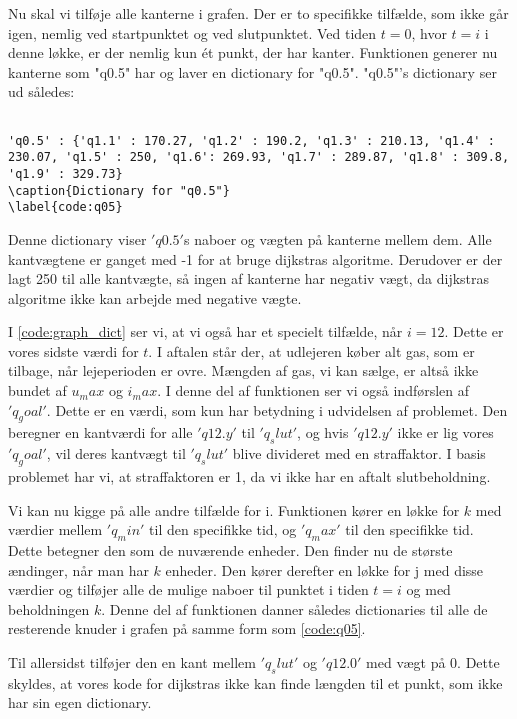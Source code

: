 Nu skal vi tilføje alle kanterne i grafen. Der er to specifikke tilfælde, som ikke går igen, nemlig ved startpunktet og ved slutpunktet. Ved tiden $t=0$, hvor $t=i$ i denne løkke, er der nemlig kun ét punkt, der har kanter. Funktionen generer nu kanterne som "q0.5" har og laver en dictionary for "q0.5". 
"q0.5"'s dictionary ser ud således:

\begin{lstlisting}

'q0.5' : {'q1.1' : 170.27, 'q1.2' : 190.2, 'q1.3' : 210.13, 'q1.4' : 230.07, 'q1.5' : 250, 'q1.6': 269.93, 'q1.7' : 289.87, 'q1.8' : 309.8, 'q1.9' : 329.73}
\caption{Dictionary for "q0.5"}
\label{code:q05}
\end{lstlisting}
Denne dictionary viser $'q0.5'$s naboer og vægten på kanterne mellem dem. Alle kantvægtene er ganget med -1 for at bruge dijkstras algoritme. Derudover er der lagt 250 til alle kantvægte, så ingen af kanterne har negativ vægt, da dijkstras algoritme ikke kan arbejde med negative vægte.

I \autoref{code:graph_dict} ser vi, at vi også har et specielt tilfælde, når $i=12$. Dette er vores sidste værdi for $t$. I aftalen står der, at udlejeren køber alt gas, som er tilbage, når lejeperioden er ovre. Mængden af gas, vi kan sælge, er altså ikke bundet af $u_max$ og $i_max$. I denne del af funktionen ser vi også indførslen af $'q_goal'$. Dette er en værdi, som kun har betydning i udvidelsen af problemet. Den beregner en kantværdi for alle $'q12.y'$ til $'q_slut'$, og hvis $'q12.y'$ ikke er lig vores $'q_goal'$, vil deres kantvægt til $'q_slut'$ blive divideret med en straffaktor. I basis problemet har vi, at straffaktoren er 1, da vi ikke har en aftalt slutbeholdning.


Vi kan nu kigge på alle andre tilfælde for i. Funktionen kører en løkke for $k$ med værdier mellem $'q_min'$ til den specifikke tid, og $'q_max'$ til den specifikke tid. Dette betegner den som de nuværende enheder.
Den finder nu de største ændinger, når man har $k$ enheder. Den kører derefter en løkke for j med disse værdier og tilføjer alle de mulige naboer til punktet i tiden $t=i$ og med beholdningen $k$. Denne del af funktionen danner således dictionaries til alle de resterende knuder i grafen på samme form som \autoref{code:q05}.

Til allersidst tilføjer den en kant mellem $'q_slut'$ og $'q12.0'$ med vægt på $0$. Dette skyldes, at vores kode for dijkstras ikke kan finde længden til et punkt, som ikke har sin egen dictionary.

